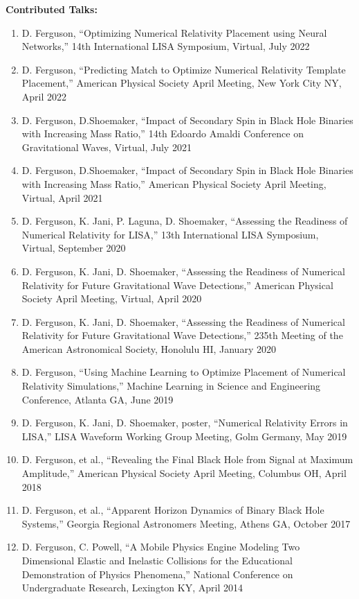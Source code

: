 \documentclass[11pt]{article}
\begin{document}
\begin{flushleft}
  \textbf{Contributed Talks:}
  \begin{enumerate}
  \item D. Ferguson, ``Optimizing Numerical Relativity Placement using Neural Networks,'' 14th International LISA Symposium, Virtual, July 2022
  \item D. Ferguson, ``Predicting Match to Optimize Numerical Relativity Template Placement,'' American Physical Society April Meeting, New York City NY, April 2022
  \item D. Ferguson, D.Shoemaker, ``Impact of Secondary Spin in Black Hole Binaries with Increasing Mass Ratio,'' 14th Edoardo Amaldi Conference on Gravitational Waves, Virtual, July 2021
  \item D. Ferguson,  D.Shoemaker, ``Impact of Secondary Spin in Black Hole Binaries with Increasing Mass Ratio,''  American Physical Society April Meeting, Virtual, April 2021
  \item D. Ferguson, K. Jani, P. Laguna, D. Shoemaker, ``Assessing the Readiness of Numerical Relativity for LISA,'' 13th International LISA Symposium, Virtual, September 2020
  \item D. Ferguson, K. Jani, D. Shoemaker, ``Assessing the Readiness of Numerical Relativity for Future Gravitational Wave Detections,'' American Physical Society April Meeting, Virtual, April 2020
  \item D. Ferguson, K. Jani, D. Shoemaker, ``Assessing the Readiness of Numerical Relativity for Future Gravitational Wave Detections,'' 235th Meeting of the American Astronomical Society, Honolulu HI, January 2020
  \item D. Ferguson, ``Using Machine Learning to Optimize Placement of Numerical Relativity Simulations,'' Machine Learning in Science and Engineering Conference, Atlanta GA, June 2019
  \item D. Ferguson, K. Jani, D. Shoemaker, poster, ``Numerical Relativity Errors in LISA,'' LISA Waveform Working Group Meeting, Golm Germany, May 2019
  \item D. Ferguson, et al., ``Revealing the Final Black Hole from Signal at Maximum Amplitude,'' American Physical Society April Meeting, Columbus OH, April 2018
  \item D. Ferguson, et al., ``Apparent Horizon Dynamics of Binary Black Hole Systems,'' Georgia Regional Astronomers Meeting, Athens GA, October 2017
  \item D. Ferguson, C. Powell, ``A Mobile Physics Engine Modeling Two Dimensional Elastic and Inelastic Collisions for the Educational Demonstration of Physics Phenomena,'' National Conference on Undergraduate Research, Lexington KY, April 2014
  \end{enumerate} 


\end{flushleft}
\end{document}
